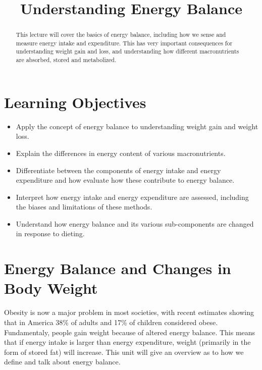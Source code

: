 \documentclass{tufte-handout}
\title{Understanding Energy Balance}
\author{}
\date{}  %
\begin{document}
\maketitle%

\begin{abstract}
\noindent This lecture will cover the basics of energy balance, including how we sense and measure energy intake and expenditure.  This has very important consequences for understanding weight gain and loss, and understanding how different macronutrients are absorbed, stored and metabolized.
\end{abstract}

\tableofcontents

\pagebreak
\section{Learning Objectives}

\begin{itemize}
\item Apply the concept of energy balance to understanding weight gain and weight loss.
\item Explain the differences in energy content of various macronutrients.
\item Differentiate between the components of energy intake and energy expenditure and how evaluate how these contribute to energy balance.
\item Interpret how energy intake and energy expenditure are assessed, including the biases and limitations of these methods.
\item Understand how energy balance and its various sub-components are changed in response to dieting.

\end{itemize}


\section{Energy Balance and Changes in Body Weight}

Obesity is now a major problem in most societies, with recent estimates showing that in America 38\% of adults and 17\% of children considered obese\citep{Flegal2016,Ogden2016}.  Fundamentaly, people gain weight because of altered energy balance.  This means that if energy intake is larger than energy expenditure, weight (primarily in the form of stored fat) will increase.  This unit will give an overview as to how we define and talk about energy balance.
\end{document}
